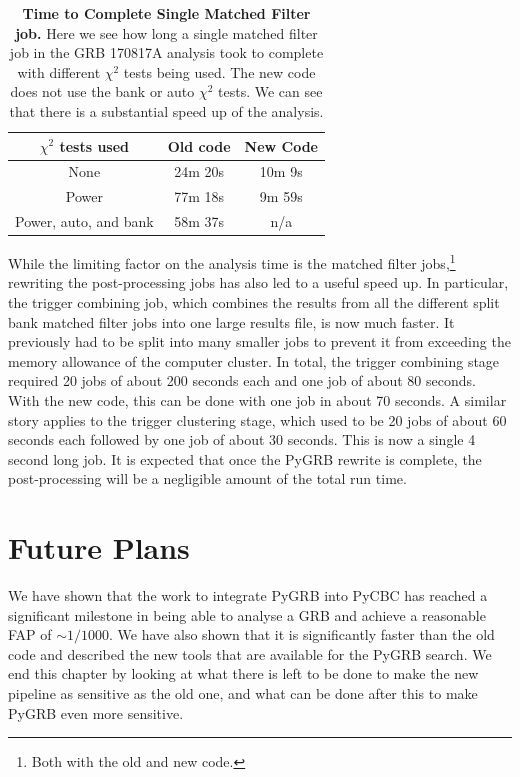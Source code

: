 \documentclass[11pt]{cuthesis}
\begin{document}
\begin{table}[h] 
\centering
\begin{tabular}{  c | c | c }
 $\chi^2$ tests used  & Old code & New Code \\ \hline                                                       
None  & 24m 20s & 10m 9s  \\
Power & 77m 18s & 9m 59s  \\
Power, auto, and bank & 58m 37s & n/a  \\
\end{tabular}
\caption{\textbf{Time to Complete Single Matched Filter job.} Here we see how long a single matched filter job in the GRB 170817A analysis took to complete with different $\chi^2$ tests being used. The new code does not use the bank or auto $\chi^2$ tests. We can see that there is a substantial speed up of the analysis. }
\label{tab:inspiral speed}
\end{table}

While the limiting factor on the analysis time is the matched filter jobs,\footnote{Both with the old and new code.} rewriting the post-processing jobs has also led to a useful speed up. In particular, the trigger combining job, which combines the results from all the different split bank matched filter jobs into one large results file, is now much faster. It previously had to be split into many smaller jobs to prevent it from exceeding the memory allowance of the computer cluster. In total, the trigger combining stage required 20 jobs of about 200 seconds each and one job of about 80 seconds. With the new code, this can be done with one job in about 70 seconds. A similar story applies to the trigger clustering stage, which used to be 20 jobs of about 60 seconds each followed by one job of about 30 seconds. This is now a single 4 second long job. It is expected that once the PyGRB rewrite is complete, the post-processing will be a negligible amount of the total run time. 


\section{Future Plans}
We have shown that the work to integrate PyGRB into PyCBC has reached a significant milestone in being able to analyse a GRB and achieve a reasonable FAP of $\sim 1/1000$. We have also shown that it is significantly faster than the old code and described the new tools that are available for the PyGRB search. We end this chapter by looking at what there is left to be done to make the new pipeline as sensitive as the old one, and what can be done after this to make PyGRB even more sensitive. 
\end{document}
